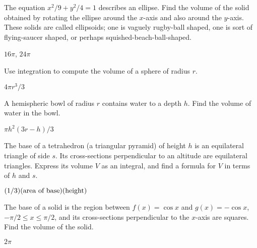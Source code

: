 \begin{exercises}
\begin{exercise} The equation $x^2/9+y^2/4=1$ describes an ellipse.  Find the
volume of the solid obtained by rotating the ellipse around the
$x$-axis and also around the $y$-axis. These solids are
called {\dfont ellipsoids\/}; one is vaguely rugby-ball shaped, one is
sort of flying-saucer shaped, or perhaps squished-beach-ball-shaped.
\begin{answer} $16\pi$, $24\pi$
\end{answer}\end{exercise}



\begin{exercise} Use integration to compute the volume of a sphere of radius
$r$. 
\begin{answer}
$4\pi r^3/3$
\end{answer}
\end{exercise}

\begin{exercise}
A hemispheric bowl of radius $r$ contains water to a depth $h$.  Find
the volume of water in the bowl.
\begin{answer} $\pi h^2(3r-h)/3$
\end{answer}\end{exercise}

\begin{exercise} The base of a tetrahedron (a triangular pyramid) of height $h$
is an equilateral triangle of side $s$.  Its cross-sections
perpendicular to an altitude are equilateral triangles.  Express its
volume $V$ as an integral, and find a formula for $V$ in terms of $h$
and $s$. 
\begin{answer}
$(1/3)(\hbox{area of base})(\hbox{height})$
\end{answer}
\end{exercise}

\begin{exercise}
The base of a solid is the region between $f(x)=\cos x$ and
$g(x)=-\cos x$, $-\pi/2\le x\le\pi/2$,
and its cross-sections perpendicular to the $x$-axis 
are squares.
Find the volume of the solid.
\begin{answer} $2\pi$
\end{answer}\end{exercise}

\end{exercises}

















